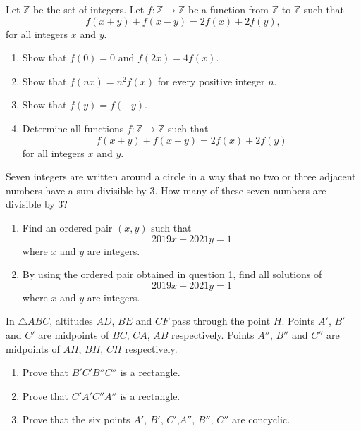 \begin{problems}
    \problem Let $\mathbb{Z}$ be the set of integers. Let $f:\mathbb{Z}
    \rightarrow \mathbb{Z}$ be a function from $\mathbb{Z}$ to $\mathbb{Z}$
    such that 
    \[f(x + y) + f(x - y) = 2f(x) + 2f(y),\]
    for all integers $x$ and $y$. 
    \begin{enumerate}
        \item Show that $f(0) = 0$ and $f(2x) = 4f(x)$. 
        
        \item Show that $f(nx) = n^2f(x)$ for every positive integer $n$. 
        
        \item Show that $f(y) = f(-y)$. 
        
        \item Determine all functions $f:\mathbb{Z} \rightarrow \mathbb{Z}$
            such that 
            \[f(x + y) + f(x - y) = 2f(x) + 2f(y)\] 
            for all integers $x$ and $y$. 
    \end{enumerate}
    
    \problem Seven integers are written around a circle in a way that no two or
    three adjacent numbers have a sum divisible by 3. How many of these seven
    numbers are divisible by 3? 
    
    \problem 
    \begin{enumerate}
        \item Find an ordered pair $(x,y)$ such that \[2019x + 2021y = 1\]
            where $x$ and $y$ are integers. 

        \item By using the ordered pair obtained in question 1, find all
            solutions of 
            \[2019x + 2021y = 1\] 
            where $x$ and $y$ are integers. 
    \end{enumerate}
    
    \problem In $\triangle ABC$, altitudes $AD$, $BE$ and $CF$ pass through the
    point $H$. Points $A'$, $B'$ and $C'$ are midpoints of $BC$, $CA$, $AB$
    respectively. Points $A''$, $B''$ and $C''$ are midpoints of $AH$, $BH$,
    $CH$ respectively. 
    \begin{enumerate}
        \item Prove that $B'C'B''C''$ is a rectangle. 
        
        \item Prove that $C'A'C''A''$ is a rectangle.
        
        \item Prove that the six points $A'$, $B'$, $C'$,$A''$, $B''$, $C''$
            are concyclic. 
        

\end{enumerate}
\end{problems}
